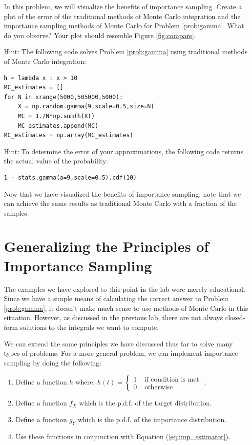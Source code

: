 \begin{problem}
In this problem, we will visualize the benefits of importance sampling. Create a plot of the error of the traditional methods of Monte Carlo integration and the importance sampling methods of Monte Carlo for Problem \ref{prob:gamma}. What do you observe? Your plot should resemble Figure \ref{fig:compare}.

Hint: The following code solves Problem \ref{prob:gamma} using traditional methods of Monte Carlo integration:
\begin{lstlisting}
h = lambda x : x > 10
MC_estimates = []
for N in xrange(5000,505000,5000):
    X = np.random.gamma(9,scale=0.5,size=N)
    MC = 1./N*np.sum(h(X))    
    MC_estimates.append(MC)
MC_estimates = np.array(MC_estimates)
\end{lstlisting}

Hint: To determine the error of your approximations, the following code returns the actual value of the probability:
\begin{lstlisting}
1 - stats.gamma(a=9,scale=0.5).cdf(10)
\end{lstlisting}
\end{problem}

Now that we have visualized the benefits of importance sampling, note that we can achieve the same results as traditional Monte Carlo with a fraction of the samples.

\section*{Generalizing the Principles of Importance Sampling}
The examples we have explored to this point in the lab were merely educational. Since we have a simple means of calculating the correct answer to Problem \ref{prob:gamma}, it doesn't make much sense to use methods of Monte Carlo in this situation. However, as discussed in the previous lab, there are not always closed-form solutions to the integrals we want to compute.

We can extend the same principles we have discussed thus far to solve many types of problems. For a more general problem, we can implement importance sampling by doing the following:
\begin{enumerate}
\item Define a function $h$ where, $h(t) = \begin{cases}
1 & \text{ if condition is met }  \\ 
0 & \text{ otherwise}
\end{cases} $.  
\item Define a function $f_X$ which is the p.d.f. of the target distribution. 
\item Define a function $g_Y$ which is the p.d.f. of the importance distribution.
\item Use these functions in conjunction with Equation (\ref{eq:imp_estimator}).
\end{enumerate}

